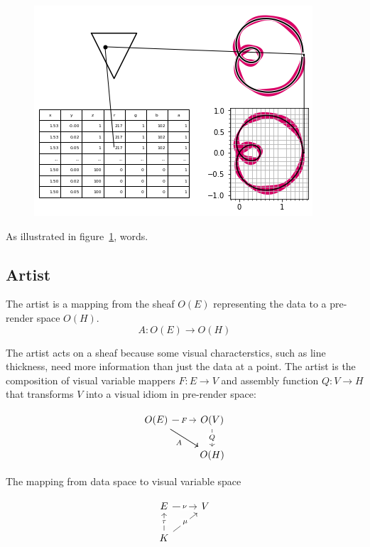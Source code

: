 \documentclass[../main.tex]{subfiles}
\begin{document}
\begin{figure}[h]
    \includegraphics[width=.4\linewidth]{figures/sections/math/render.png}
    \caption{}
    \label{fig:render}
\end{figure}

As illustrated in figure~\ref{fig:render}, words.

\subsection{Artist}

The artist is a mapping from the sheaf $O(E)$ representing the data to a pre-render space $O(H)$. 
\begin{equation}
    A: O(E) \rightarrow O(H)
\end{equation}

The artist acts on a sheaf because some visual characterstics, such as line thickness, need more information than just the data at a point. The artist is the composition of visual variable mappers $F: E \rightarrow V$ and assembly function  $Q: V \rightarrow H$ that transforms $V$ into a visual idiom\cite{munznerMarksChannels} in pre-render space:

\begin{equation}
    \begin{tikzcd}
        O(E) \arrow[r, "F" description] \arrow[rd, "A"'] \arrow[rd] & O(V) \arrow[d, "Q" description] \\
                                                                    & O(H)                           
        \end{tikzcd}
\end{equation}

The mapping from data space to visual variable  \cite{carpendaleVisualRepresentationSemiology,bertinIIPropertiesGraphic2011,munznerWhatDataAbstraction2014} space

\begin{equation}
    \begin{tikzcd}
        E \arrow[r, "\nu" description]                                & V \\
        K \arrow[u, "\tau" description] \arrow[ru, "\mu" description] &  
    \end{tikzcd}
\end{equation}
\end{document}
